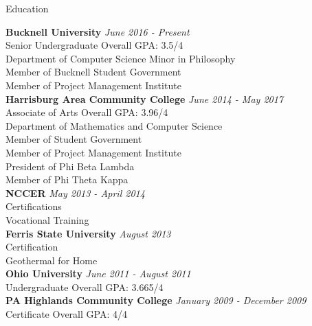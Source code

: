 \documentclass{resume} %
\begin{document}

\begin{rSection}{Education}

{\bf Bucknell University} \hfill {\em June 2016 - Present} 
\\ Senior Undergraduate \hfill { Overall GPA: 3.5/4}
\\ Department of Computer Science 
Minor in Philosophy \smallskip \\
Member of Bucknell Student Government \\
Member of Project Management Institute \\

{\bf Harrisburg Area Community College} \hfill {\em June 2014 - May 2017} 
\\ Associate of Arts \hfill { Overall GPA: 3.96/4}
\\ Department of Mathematics and Computer Science 
\smallskip \\
Member of Student Government \\
Member of Project Management Institute \\
President of Phi Beta Lambda \\
Member of Phi Theta Kappa \\

{\bf NCCER} \hfill {\em May 2013 - April 2014} 
\\ Certifications \hfill {}
\\ Vocational Training 
\smallskip \\

{\bf Ferris State University} \hfill {\em August 2013} 
\\ Certification \hfill {}
\\ Geothermal for Home
\smallskip \\

{\bf Ohio University} \hfill {\em June 2011 - August 2011} 
\\ Undergraduate \hfill { Overall GPA: 3.665/4} 
\smallskip \\

{\bf PA Highlands Community College} \hfill {\em January 2009 - December 2009} 
\\ Certificate \hfill { Overall GPA: 4/4}
\smallskip \\

\end{rSection}
\end{document}
